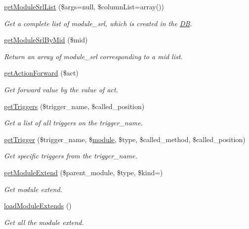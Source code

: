 \begin{DoxyCompactItemize}
\hyperlink{classmoduleModel_ae63e7e551002fac4c01a330a76dd7244}{get\+Module\+Srl\+List} (\$args=null, \$column\+List=array())
\begin{DoxyCompactList}\small\item\em Get a complete list of module\+\_\+srl, which is created in the \hyperlink{classDB}{D\+B}. \end{DoxyCompactList}\item 
\hyperlink{classmoduleModel_a857a241844d60b7678bd144175d23f29}{get\+Module\+Srl\+By\+Mid} (\$mid)
\begin{DoxyCompactList}\small\item\em Return an array of module\+\_\+srl corresponding to a mid list. \end{DoxyCompactList}\item 
\hyperlink{classmoduleModel_a2a06b59fa663c1e79f81aac571e2e5c8}{get\+Action\+Forward} (\$act)
\begin{DoxyCompactList}\small\item\em Get forward value by the value of act. \end{DoxyCompactList}\item 
\hyperlink{classmoduleModel_a979238a3b59bf52ccaa29ec3f7744808}{get\+Triggers} (\$trigger\+\_\+name, \$called\+\_\+position)
\begin{DoxyCompactList}\small\item\em Get a list of all triggers on the trigger\+\_\+name. \end{DoxyCompactList}\item 
\hyperlink{classmoduleModel_ae570716b47c7fd19b7fc0d217a155b22}{get\+Trigger} (\$trigger\+\_\+name, \$\hyperlink{classmodule}{module}, \$type, \$called\+\_\+method, \$called\+\_\+position)
\begin{DoxyCompactList}\small\item\em Get specific triggers from the trigger\+\_\+name. \end{DoxyCompactList}\item 
\hyperlink{classmoduleModel_a1dd3c03b874a4f6e05f6b5e8ec283665}{get\+Module\+Extend} (\$parent\+\_\+module, \$type, \$kind=\textquotesingle{}\textquotesingle{})
\begin{DoxyCompactList}\small\item\em Get module extend. \end{DoxyCompactList}\item 
\hyperlink{classmoduleModel_adfde81ebf0fcb2814ba49ad23ce803ff}{load\+Module\+Extends} ()
\begin{DoxyCompactList}\small\item\em Get all the module extend. \end{DoxyCompactList}\item 

\end{DoxyCompactItemize}
